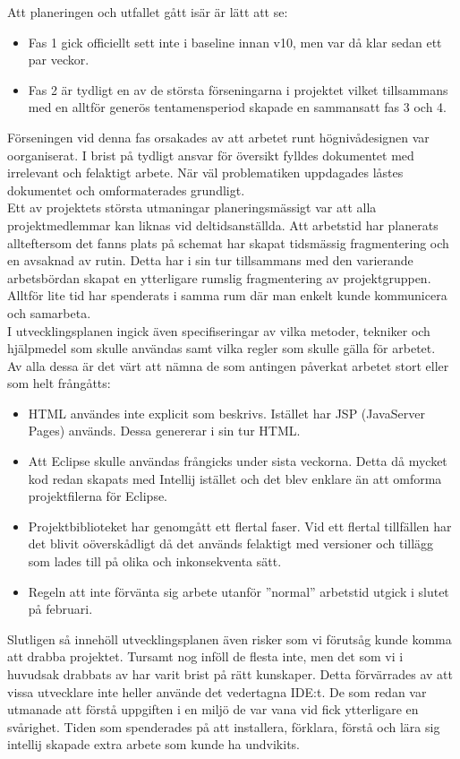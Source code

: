 \documentclass[paper=a4, fontsize=11pt,twoside]{article}
\begin{document}
Att planeringen och utfallet gått isär är lätt att se:
\begin{itemize}
  \item Fas 1 gick officiellt sett inte i baseline innan v10, men var då klar sedan ett par veckor.
  \item Fas 2 är tydligt en av de största förseningarna i projektet vilket tillsammans med en alltför generös tentamensperiod skapade en sammansatt fas 3 och 4.
\end{itemize}
Förseningen vid denna fas orsakades av att arbetet runt högnivådesignen var oorganiserat. 
I brist på tydligt ansvar för översikt fylldes dokumentet med irrelevant och felaktigt arbete. 
När väl problematiken uppdagades låstes dokumentet och omformaterades
grundligt.\\
Ett av projektets största utmaningar planeringsmässigt var att alla projektmedlemmar 
kan liknas vid deltidsanställda. Att arbetstid har planerats allteftersom det fanns 
plats på schemat har skapat tidsmässig fragmentering och en avsaknad av rutin. Detta har 
i sin tur tillsammans med den varierande arbetsbördan skapat en ytterligare rumslig 
fragmentering av projektgruppen. Alltför lite tid har spenderats i samma rum där man enkelt 
kunde kommunicera och samarbeta.\\
I utvecklingsplanen ingick även specifiseringar av vilka metoder, tekniker och hjälpmedel 
som skulle användas samt vilka regler som skulle gälla för arbetet.\\
Av alla dessa är det värt att nämna de som antingen påverkat arbetet stort 
eller som helt frångåtts:
\begin{itemize}
  \item HTML användes inte explicit som beskrivs. Istället har JSP (JavaServer
  Pages) används. Dessa genererar i sin tur HTML.
  \item Att Eclipse skulle användas frångicks under sista veckorna. Detta då
  mycket kod redan skapats med Intellij istället och det blev enklare än att 
  omforma projektfilerna för Eclipse.
  \item Projektbiblioteket har genomgått ett flertal faser. Vid ett flertal
  tillfällen har det blivit oöverskådligt då det används felaktigt med versioner 
  och tillägg som lades till på olika och inkonsekventa sätt.
  \item Regeln att inte förvänta sig arbete utanför ”normal” arbetstid utgick i
  slutet på februari.
\end{itemize}

Slutligen så innehöll utvecklingsplanen även risker som vi förutsåg kunde komma 
att drabba projektet. Tursamt nog inföll de flesta inte, men det som vi i huvudsak 
drabbats av har varit brist på rätt kunskaper. Detta förvärrades av att vissa 
utvecklare inte heller använde det vedertagna IDE:t. De som redan var utmanade att 
förstå uppgiften i en miljö de var vana vid fick ytterligare en svårighet. Tiden 
som spenderades på att installera, förklara, förstå och lära sig intellij skapade 
extra arbete som kunde ha undvikits.
\end{document}

